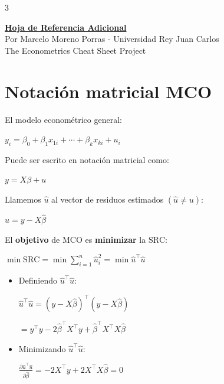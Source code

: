 \documentclass[10pt, a4paper, landscape]{article}
\newcommand{\SSR}{\text{SRC}}
\begin{document}
\begin{multicols}{3}

\begin{center}
	\textbf{\LARGE \href{https://github.com/marcelomijas/econometrics-cheatsheet}{Hoja de Referencia Adicional}} \\
	{\footnotesize Por Marcelo Moreno Porras - Universidad Rey Juan Carlos} \\
	{\footnotesize The Econometrics Cheat Sheet Project}
\end{center}

\section*{Notación matricial MCO}

El modelo econométrico general:

\begin{center}
	\( y_{i} = \beta_{0} + \beta_{1} x_{1i} + \cdots + \beta_{k} x_{ki} + u_{i} \)
\end{center}

Puede ser escrito en notación matricial como:

\begin{center}
	\( y = X \beta + u \)
\end{center}

Llamemos \( \hat{u} \) al vector de residuos estimados \( (\hat{u} \neq u) \):

\begin{center}
	\( \hat{u} = y - X \hat{\beta} \)
\end{center}

El \textbf{objetivo} de MCO es \textbf{minimizar} la \( \SSR \):

\begin{center}
	\( \min \SSR = \min \sum_{i = 1}^{n} \hat{u}_{i}^{2} = \min \hat{u}^{\top} \hat{u} \)
\end{center}

\begin{itemize}[leftmargin=*]
	\item Definiendo \( \hat{u}^{\top} \hat{u} \):
	\begin{center}
		\( \hat{u}^{\top} \hat{u} = (y - X \hat{\beta})^{\top} (y - X \hat{\beta}) \)

		\( = y^{\top} y - 2 \hat{\beta}^{\top} X^{\top} y + \hat{\beta}^{\top} X^{\top} X \hat{\beta} \)
	\end{center}
	\item Minimizando \( \hat{u}^{\top} \hat{u} \):
	\begin{center}
		\( \frac{\partial \hat{u}^{\top} \hat{u}}{\partial \hat{\beta}} = -2 X^{\top} y + 2 X^{\top} X \hat{\beta} = 0 \)


\end{center}
\end{itemize}
\end{multicols}
\end{document}

